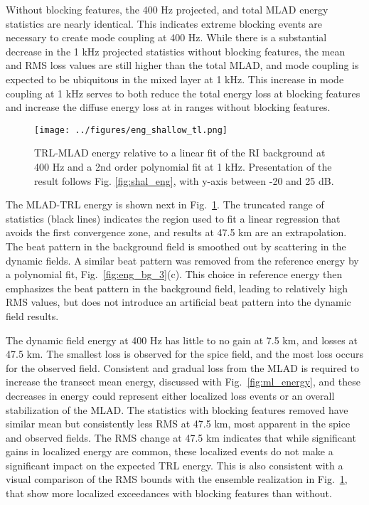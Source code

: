 \documentclass[preprint,NumberedRefs]{JASA}
\begin{document}
Without blocking features, the 400 Hz projected, and total MLAD energy statistics are nearly identical. This indicates extreme blocking events are necessary to create mode coupling at 400 Hz. While there is a substantial decrease in the 1 kHz projected statistics without blocking features, the mean and RMS loss values are still higher than the total MLAD, and mode coupling is expected to be ubiquitous in the mixed layer at 1 kHz. This increase in mode coupling at 1 kHz serves to both reduce the total energy loss at blocking features and increase the diffuse energy loss at in ranges without blocking features.

\begin{figure}
\texttt{[image: ../figures/eng\_shallow\_tl.png]}
        \caption{TRL-MLAD energy relative to a linear fit of the RI background at 400 Hz and a 2nd order polynomial fit at 1 kHz. Presentation of the result follows Fig. \ref{fig:shal_eng}, with y-axis between -20 and 25 dB.}
    \label{fig:eng_tl}
\end{figure}
The MLAD-TRL energy is shown next in Fig.~\ref{fig:eng_tl}. The truncated range of statistics (black lines) indicates the region used to fit a linear regression that avoids the first convergence zone, and results at 47.5 km are an extrapolation. The beat pattern in the background field is smoothed out by scattering in the dynamic fields. A similar beat pattern was removed from the reference energy by a polynomial fit, Fig.~\ref{fig:eng_bg_3}(c). This choice in reference energy then emphasizes the beat pattern in the background field, leading to relatively high RMS values, but does not introduce an artificial beat pattern into the dynamic field results.

The dynamic field energy at 400 Hz has little to no gain at 7.5 km, and losses at 47.5 km. The smallest loss is observed for the spice field, and the most loss occurs for the observed field. Consistent and gradual loss from the MLAD is required to increase the transect mean energy, discussed with Fig.~\ref{fig:ml_energy}, and these decreases in energy could represent either localized loss events or an overall stabilization of the MLAD. The statistics with blocking features removed have similar mean but consistently less RMS at 47.5 km, most apparent in the spice and observed fields. The RMS change at 47.5 km indicates that while significant gains in localized energy are common, these localized events do not make a significant impact on the expected TRL energy. This is also consistent with a visual comparison of the RMS bounds with the ensemble realization in Fig.~\ref{fig:eng_tl}, that show more localized exceedances with blocking features than without.
\end{document}
